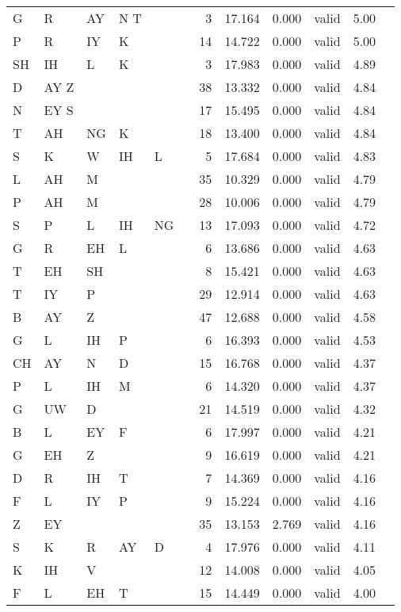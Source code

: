 \begin{longtable}{l@{ } l@{ } l@{ } l@{ } l@{ } l r r r r r r}
G & R & AY & N T &   &   & 3 & 17.164 & 0.000 & valid & 5.00 \\
P & R & IY & K &   &   & 14 & 14.722 & 0.000 & valid & 5.00 \\
SH & IH & L & K &   &   & 3 & 17.983 & 0.000 & valid & 4.89 \\
D & AY Z &   &   &   &   & 38 & 13.332 & 0.000 & valid & 4.84 \\
N & EY S &   &   &   &   & 17 & 15.495 & 0.000 & valid & 4.84 \\
T & AH & NG & K &   &   & 18 & 13.400 & 0.000 & valid & 4.84 \\
S & K & W & IH & L &   & 5 & 17.684 & 0.000 & valid & 4.83 \\
L & AH & M &   &   &   & 35 & 10.329 & 0.000 & valid & 4.79 \\
P & AH & M &   &   &   & 28 & 10.006 & 0.000 & valid & 4.79 \\
S & P & L & IH & NG &   & 13 & 17.093 & 0.000 & valid & 4.72 \\
G & R & EH & L &   &   & 6 & 13.686 & 0.000 & valid & 4.63 \\
T & EH & SH &   &   &   & 8 & 15.421 & 0.000 & valid & 4.63 \\
T & IY & P &   &   &   & 29 & 12.914 & 0.000 & valid & 4.63 \\
B & AY & Z &   &   &   & 47 & 12.688 & 0.000 & valid & 4.58 \\
G & L & IH & P &   &   & 6 & 16.393 & 0.000 & valid & 4.53 \\
CH & AY & N & D &   &   & 15 & 16.768 & 0.000 & valid & 4.37 \\
P & L & IH & M &   &   & 6 & 14.320 & 0.000 & valid & 4.37 \\
G & UW & D &   &   &   & 21 & 14.519 & 0.000 & valid & 4.32 \\
B & L & EY & F &   &   & 6 & 17.997 & 0.000 & valid & 4.21 \\
G & EH & Z &   &   &   & 9 & 16.619 & 0.000 & valid & 4.21 \\
D & R & IH & T &   &   & 7 & 14.369 & 0.000 & valid & 4.16 \\
F & L & IY & P &   &   & 9 & 15.224 & 0.000 & valid & 4.16 \\
Z & EY &   &   &   &   & 35 & 13.153 & 2.769 & valid & 4.16 \\
S & K & R & AY & D &   & 4 & 17.976 & 0.000 & valid & 4.11 \\
K & IH & V &   &   &   & 12 & 14.008 & 0.000 & valid & 4.05 \\
F & L & EH & T &   &   & 15 & 14.449 & 0.000 & valid & 4.00 \\

\end{longtable}
